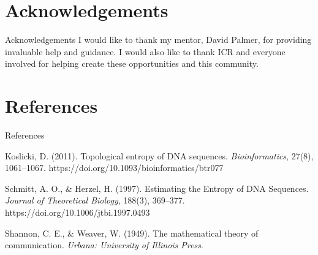 \documentclass[12pt]{beamer}
\begin{document}
	\section{Acknowledgements}
	\begin{frame}{Acknowledgements}
		I would like to thank my mentor, David Palmer, for providing invaluable help and guidance.
		\vfill
		I would also like to thank ICR and everyone involved for helping create these opportunities and this community.
	\end{frame}

	\section{References}
	\begin{frame}{References}
		\footnotesize
		\begin{hangparas}{.25in}{1}
		Koslicki, D. (2011). Topological entropy of DNA sequences. \emph{Bioinformatics}, 27(8), 1061–1067. https://doi.org/10.1093/bioinformatics/btr077 

		Schmitt, A. O., \& Herzel, H. (1997). Estimating the Entropy of DNA Sequences. \emph{Journal of Theoretical Biology}, 188(3), 369–377. https://doi.org/10.1006/jtbi.1997.0493 
		
		Shannon, C. E., \& Weaver, W. (1949). The mathematical theory of communication. \emph{Urbana: University of Illinois Press}.
		\end{hangparas}
	\end{frame}
\end{document}
